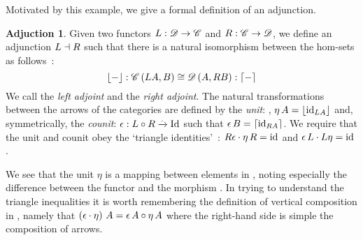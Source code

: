 \theoremstyle{definition}\newtheorem*{adjunctiondef}{Adjuction}
Motivated by this example, we give a formal definition of an adjunction.
\begin{adjunctiondef}
    Given two functors $\mathnormal{L}: \mathscr{D} \to \mathscr{C}$ and $\mathnormal{R}:
    \mathscr{C} \to \mathscr{D}$, we define an adjunction $\mathnormal{L} \dashv \mathnormal{R}$
    such that there is a natural isomorphism between the
    hom-sets as follows~\cite{RelationalAlgebraByWayOfAdjunctions}:
    \[
        \lfloor - \rfloor: \mathscr{C}\left(\mathnormal{L} \mathnormal{A}, B\right) \cong
        \mathscr{D}\left(A, \mathnormal{R} \mathnormal{B}\right) :\lceil - \rceil
    \]
    We call  the \emph{left adjoint} and  the \emph{right
    adjoint}.
    The natural transformations between the arrows of the categories are defined
    by the \emph{unit}: , $\eta\,A =
    \lfloor \mathrm{id}_{\mathnormal{\mathnormal{L} \mathnormal{A}}} \rfloor$ and, symmetrically, the
    \emph{counit}:
    $\epsilon: \mathnormal{L \circ R} \xrightarrow{.} \mathnormal{\mathrm{Id}}$ such that
    $\epsilon\,B = \lceil \mathrm{id}_{\mathnormal{\mathnormal{R} \mathnormal{A}}} \rceil$. We
    require that the unit and counit obey the `triangle
    identities'~\cite{RelationalAlgebraByWayOfAdjunctions}:
      $
      \mathnormal{R} \mathnormal{\epsilon} \cdot \eta\,\mathnormal{R} 
      = \mathrm{id}_{\mathnormal{}}
      $
    and
      $
      \epsilon\,\mathnormal{L} \cdot \mathnormal{L} \mathnormal{\eta} 
      = \mathrm{id}_{\mathnormal{}}
      $.

\end{adjunctiondef}

We see that the unit $\eta$ is a mapping between elements in , noting
especially the difference between the functor  and the
morphism .
In trying to understand the triangle inequalities it is worth remembering the
definition of vertical composition in , namely
that
$\left(\epsilon \cdot \eta\right)\,\mathnormal{A} =
\mathnormal{\epsilon\,\mathnormal{A}} \circ \mathnormal{\eta\,\mathnormal{A}}$
where the right-hand side is simple the composition of arrows.
